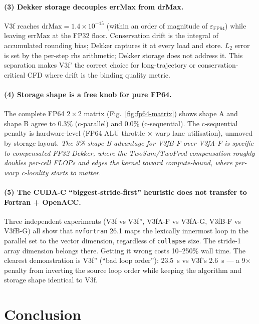 \documentclass[11pt,a4paper]{article}
\begin{document}
\paragraph{(3) Dekker storage decouples errMax from drMax.}
V3f reaches \(\mathrm{drMax} = 1.4\times 10^{-15}\) (within an order
of magnitude of \(\varepsilon_{\mathrm{FP64}}\)) while leaving
\(\mathrm{errMax}\) at the FP32 floor.  Conservation drift is the
integral of accumulated rounding bias; Dekker captures it at every
load and store.  \(L_2\) error is set by the per-step rhs arithmetic;
Dekker storage does not address it.  This separation makes V3f' the
correct choice for long-trajectory or conservation-critical CFD
where drift is the binding quality metric.

\paragraph{(4) Storage shape is a free knob for pure FP64.}
The complete FP64 \(2\times 2\) matrix
(Fig.~\ref{fig:fp64-matrix}) shows shape A and shape B agree to 0.3\%
(c-parallel) and 0.0\% (c-sequential). The c-sequential penalty is
hardware-level (FP64 ALU throttle \(\times\) warp lane utilisation),
unmoved by storage layout. \emph{The 3\% shape-B advantage for V3fB-F
over V3fA-F is specific to compensated FP32-Dekker, where the
TwoSum/TwoProd compensation roughly doubles per-cell FLOPs and edges
the kernel toward compute-bound, where per-warp c-locality starts
to matter.}

\paragraph{(5) The CUDA-C ``biggest-stride-first'' heuristic does not
transfer to Fortran + OpenACC.} Three independent experiments
(V3f vs V3f'', V3fA-F vs V3fA-G, V3fB-F vs V3fB-G) all show that
\texttt{nvfortran} 26.1 maps the lexically innermost loop in the
parallel set to the vector dimension, regardless of \texttt{collapse}
size. The stride-1 array dimension belongs there. Getting it wrong
costs 10--250\% wall time. The clearest demonstration is V3f''
(``bad loop order''): 23.5~s vs V3f's 2.6~s --- a 9\(\times\) penalty
from inverting the source loop order while keeping the algorithm and
storage shape identical to V3f.

\section{Conclusion}
\label{sec:conclusion}
\end{document}
